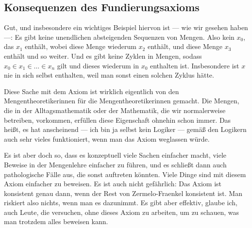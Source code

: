 \subsection{Konsequenzen des Fundierungsaxioms}

\begin{spoken-clean}[00:05:48 - 00:08:22]
Gut, und insbesondere ein wichtiges Beispiel hiervon ist --- wie wir gesehen haben ---: Es gibt keine unendlichen absteigenden Sequenzen von Mengen. Also kein $x_0$, das $x_1$ enthält, wobei diese Menge wiederum $x_2$ enthält, und diese Menge $x_3$ enthält und so weiter. Und es gibt keine Zyklen in Mengen, sodass $x_0 \in x_1 \in \dots \in x_n$ gilt und dieses wiederum in $x_0$ enthalten ist. Insbesondere ist $x$ nie in sich selbst enthalten, weil man sonst einen solchen Zyklus hätte.

Diese Sache mit dem Axiom ist wirklich eigentlich von den Mengentheoretikerinnen für die Mengentheoretikerinnen gemacht. Die Mengen, die in der Alltagsmathematik oder der Mathematik, die wir normalerweise betreiben, vorkommen, erfüllen diese Eigenschaft ohnehin schon immer. Das heißt, es hat anscheinend --- ich bin ja selbst kein Logiker --- gemäß den Logikern auch sehr vieles funktioniert, wenn man das Axiom weglassen würde.

Es ist aber doch so, dass es konzeptuell viele Sachen einfacher macht, viele Beweise in der Mengenlehre einfacher zu führen, und es schließt dann auch pathologische Fälle aus, die sonst auftreten könnten. Viele Dinge sind mit diesem Axiom einfacher zu beweisen. Es ist auch nicht gefährlich: Das Axiom ist konsistent genau dann, wenn der Rest von Zermelo-Fraenkel konsistent ist. Man riskiert also nichts, wenn man es dazunimmt. Es gibt aber effektiv, glaube ich, auch Leute, die versuchen, ohne dieses Axiom zu arbeiten, um zu schauen, was man trotzdem alles beweisen kann.
\end{spoken-clean}

